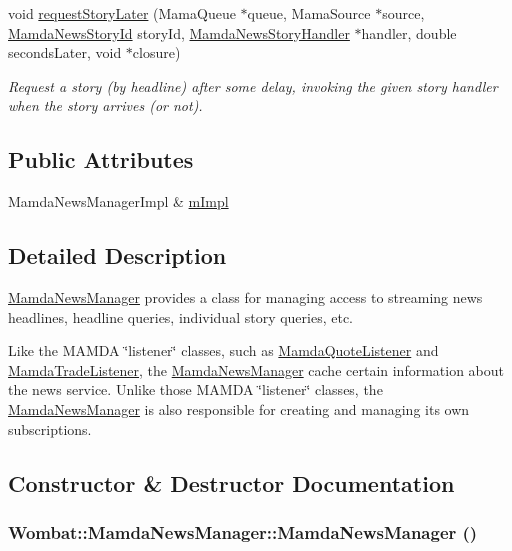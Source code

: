 \begin{CompactItemize}
void \hyperlink{classWombat_1_1MamdaNewsManager_c1db582ac31de14ac5a9984311331dd3}{request\-Story\-Later} (Mama\-Queue $\ast$queue, Mama\-Source $\ast$source, \hyperlink{namespaceWombat_f7b94f4bb44eb78420c0d3ba0413424e}{Mamda\-News\-Story\-Id} story\-Id, \hyperlink{classWombat_1_1MamdaNewsStoryHandler}{Mamda\-News\-Story\-Handler} $\ast$handler, double seconds\-Later, void $\ast$closure)
\begin{CompactList}\small\item\em Request a story (by headline) after some delay, invoking the given story handler when the story arrives (or not). \item\end{CompactList}\end{CompactItemize}
\subsection*{Public Attributes}
\begin{CompactItemize}
\item 
Mamda\-News\-Manager\-Impl \& \hyperlink{classWombat_1_1MamdaNewsManager_571ea69d4f3d3c8372b601ae4299e580}{m\-Impl}
\end{CompactItemize}


\subsection{Detailed Description}
\hyperlink{classWombat_1_1MamdaNewsManager}{Mamda\-News\-Manager} provides a class for managing access to streaming news headlines, headline queries, individual story queries, etc. 

Like the MAMDA \char`\"{}listener\char`\"{} classes, such as \hyperlink{classWombat_1_1MamdaQuoteListener}{Mamda\-Quote\-Listener} and \hyperlink{classWombat_1_1MamdaTradeListener}{Mamda\-Trade\-Listener}, the \hyperlink{classWombat_1_1MamdaNewsManager}{Mamda\-News\-Manager} cache certain information about the news service. Unlike those MAMDA \char`\"{}listener\char`\"{} classes, the \hyperlink{classWombat_1_1MamdaNewsManager}{Mamda\-News\-Manager} is also responsible for creating and managing its own subscriptions. 



\subsection{Constructor \& Destructor Documentation}
\hypertarget{classWombat_1_1MamdaNewsManager_5056810c9f824cebbd5a5a71aed04bc8}{
\subsubsection[MamdaNewsManager]{\setlength{\rightskip}{0pt plus 5cm}Wombat::Mamda\-News\-Manager::Mamda\-News\-Manager ()}}
\label{classWombat_1_1MamdaNewsManager_5056810c9f824cebbd5a5a71aed04bc8}


